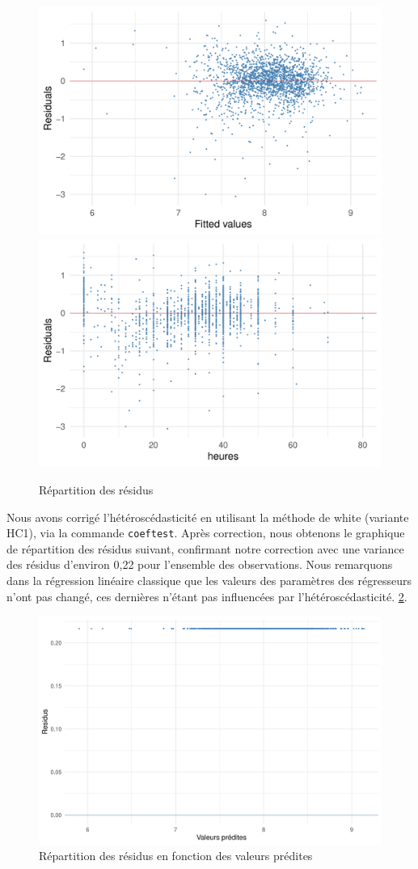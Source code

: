 \documentclass[a4paper, french, 11 pt]{article}\usepackage[]{graphicx}\usepackage[]{xcolor}
\begin{document}
\begin{figure}[h]
\center
\includegraphics[width=0.49\linewidth]{figure/plot_hetero_fitted.pdf}
\includegraphics[width=0.49\linewidth]{figure/plot_hetero_heures.pdf}
\caption{Répartition des résidus\label{fig:hetero}}
\end{figure}



Nous avons corrigé l'hétéroscédasticité en utilisant la méthode de white (variante HC1), via la commande \verb+coeftest+. Après correction, nous obtenons le graphique de répartition des résidus suivant, confirmant notre correction avec une variance des résidus d’environ 0,22 pour l’ensemble des observations. Nous remarquons dans la régression linéaire classique que les valeurs des paramètres des régresseurs n’ont pas changé, ces dernières n’étant pas influencées par l’hétéroscédasticité. \ref{fig:hetero_correct}.

\begin{figure}[h]
\center
\includegraphics[width=0.7\linewidth]{figure/hetero_correct.pdf}
\caption{Répartition des résidus en fonction des valeurs prédites\label{fig:hetero_correct}}
\end{figure}
\end{document}
